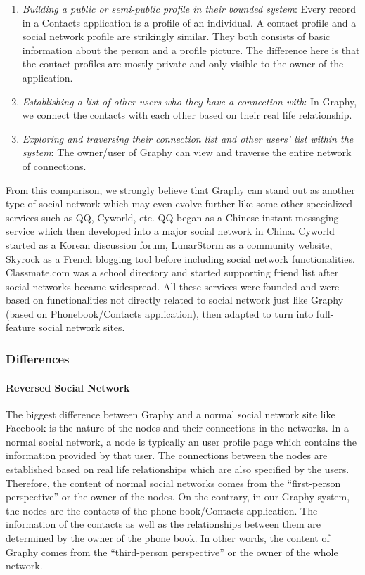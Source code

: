 \begin{enumerate}
    \item \textit{Building a public or semi-public profile in their bounded system}: Every record in a Contacts application is a profile of an individual. A contact profile and a social network profile are strikingly similar. They both consists of basic information about the person and a profile picture. The difference here is that the contact profiles are mostly private and only visible to the owner of the application.
    \item \textit{Establishing a list of other users who they have a connection with}: In Graphy, we connect the contacts with each other based on their real life relationship.
    \item \textit{Exploring and traversing their connection list and other users' list within the system}: The owner/user of Graphy can view and traverse the entire network of connections.
\end{enumerate}

From this comparison, we strongly believe that Graphy can stand out as another type of social network which may even evolve further like some other specialized services such as QQ, Cyworld, etc. QQ began as a Chinese instant messaging service which then developed into a major social network in China. Cyworld started as a Korean discussion forum, LunarStorm as a community website, Skyrock as a French blogging tool before including social network functionalities. Classmate.com was a school directory and started supporting friend list after social networks became widespread. All these services were founded and were based on functionalities not directly related to social network just like Graphy (based on Phonebook/Contacts application), then adapted to turn into full-feature social network sites.

\subsubsection{Differences}

\paragraph{Reversed Social Network}
The biggest difference between Graphy and a normal social network site like Facebook is the nature of the nodes and their connections in the networks. In a normal social network, a node is typically an user profile page which contains the information provided by that user. The connections between the nodes are established based on real life relationships which are also specified by the users. Therefore, the content of normal social networks comes from the ``first-person perspective'' or the owner of the nodes. On the contrary, in our Graphy system, the nodes are the contacts of the phone book/Contacts application. The information of the contacts as well as the relationships between them are determined by the owner of the phone book. In other words, the content of Graphy comes from the ``third-person perspective'' or the owner of the whole network.

